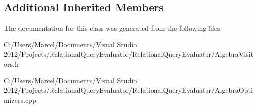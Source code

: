 \subsection*{Additional Inherited Members}


The documentation for this class was generated from the following files\+:\begin{DoxyCompactItemize}
\item 
C\+:/\+Users/\+Marcel/\+Documents/\+Visual Studio 2012/\+Projects/\+Relational\+Query\+Evaluator/\+Relational\+Query\+Evaluator/Algebra\+Visitors.\+h\item 
C\+:/\+Users/\+Marcel/\+Documents/\+Visual Studio 2012/\+Projects/\+Relational\+Query\+Evaluator/\+Relational\+Query\+Evaluator/Algebra\+Optimizers.\+cpp\end{DoxyCompactItemize}
